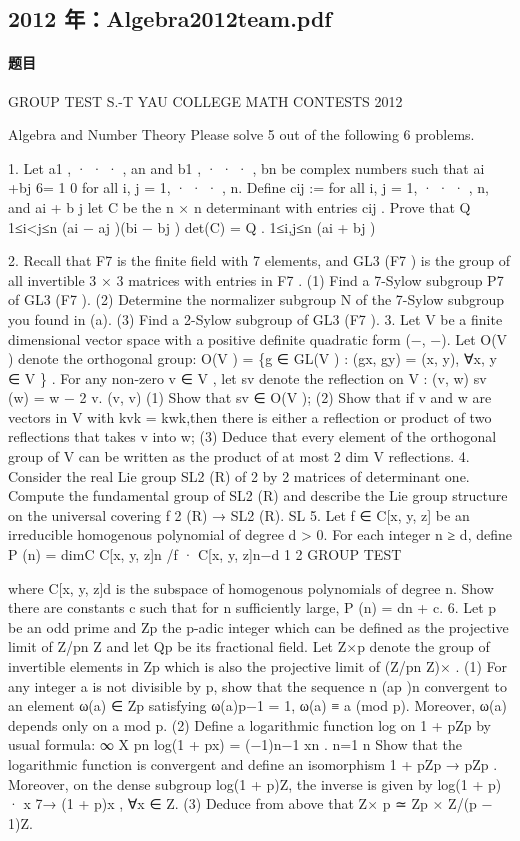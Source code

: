 \documentclass[UTF8,12pt]{ctexart}
\begin{document}
\subsection{2012 年：Algebra2012team.pdf}
\paragraph{题目}
GROUP TEST S.-T YAU COLLEGE MATH CONTESTS 2012

Algebra and Number Theory Please solve 5 out of the following 6 problems.

1. Let a1 , · · · , an and b1 , · · · , bn be complex numbers such that ai +bj 6= 1 0 for all i, j = 1, · · · , n. Define cij := for all i, j = 1, · · · , n, and ai + b j let C be the n × n determinant with entries cij . Prove that Q 1≤i<j≤n (ai − aj )(bi − bj ) det(C) = Q . 1≤i,j≤n (ai + bj )

2. Recall that F7 is the finite field with 7 elements, and GL3 (F7 ) is the group of all invertible 3 × 3 matrices with entries in F7 . (1) Find a 7-Sylow subgroup P7 of GL3 (F7 ). (2) Determine the normalizer subgroup N of the 7-Sylow subgroup you found in (a). (3) Find a 2-Sylow subgroup of GL3 (F7 ). 3. Let V be a finite dimensional vector space with a positive definite quadratic form (−, −). Let O(V ) denote the orthogonal group: O(V ) = \{g ∈ GL(V ) : (gx, gy) = (x, y), ∀x, y ∈ V \} . For any non-zero v ∈ V , let sv denote the reflection on V : (v, w) sv (w) = w − 2 v. (v, v) (1) Show that sv ∈ O(V ); (2) Show that if v and w are vectors in V with kvk = kwk,then there is either a reflection or product of two reflections that takes v into w; (3) Deduce that every element of the orthogonal group of V can be written as the product of at most 2 dim V reflections. 4. Consider the real Lie group SL2 (R) of 2 by 2 matrices of determinant one. Compute the fundamental group of SL2 (R) and describe the Lie group structure on the universal covering f 2 (R) → SL2 (R). SL 5. Let f ∈ C[x, y, z] be an irreducible homogenous polynomial of degree d > 0. For each integer n ≥ d, define P (n) = dimC C[x, y, z]n /f · C[x, y, z]n−d 1 2 GROUP TEST

where C[x, y, z]d is the subspace of homogenous polynomials of degree n. Show there are constants c such that for n sufficiently large, P (n) = dn + c. 6. Let p be an odd prime and Zp the p-adic integer which can be defined as the projective limit of Z/pn Z and let Qp be its fractional field. Let Z×p denote the group of invertible elements in Zp which is also the projective limit of (Z/pn Z)× . (1) For any integer a is not divisible by p, show that the sequence n (ap )n convergent to an element ω(a) ∈ Zp satisfying ω(a)p−1 = 1, ω(a) ≡ a (mod p). Moreover, ω(a) depends only on a mod p. (2) Define a logarithmic function log on 1 + pZp by usual formula: ∞ X pn log(1 + px) = (−1)n−1 xn . n=1 n Show that the logarithmic function is convergent and define an isomorphism 1 + pZp → pZp . Moreover, on the dense subgroup log(1 + p)Z, the inverse is given by log(1 + p) · x 7→ (1 + p)x , ∀x ∈ Z. (3) Deduce from above that Z× p ≃ Zp × Z/(p − 1)Z.
\end{document}
